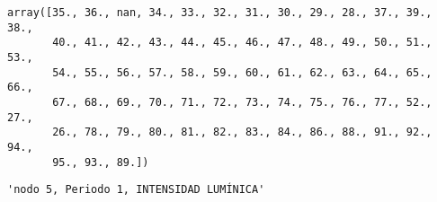 \documentclass[11pt]{article}
\begin{document}
    
    
    \begin{verbatim}
array([35., 36., nan, 34., 33., 32., 31., 30., 29., 28., 37., 39., 38.,
       40., 41., 42., 43., 44., 45., 46., 47., 48., 49., 50., 51., 53.,
       54., 55., 56., 57., 58., 59., 60., 61., 62., 63., 64., 65., 66.,
       67., 68., 69., 70., 71., 72., 73., 74., 75., 76., 77., 52., 27.,
       26., 78., 79., 80., 81., 82., 83., 84., 86., 88., 91., 92., 94.,
       95., 93., 89.])
    \end{verbatim}

    
    
    \begin{verbatim}
'nodo 5, Periodo 1, INTENSIDAD LUMÍNICA'
    \end{verbatim}

    
    
\end{document}
